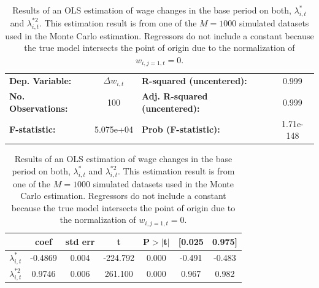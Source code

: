 \documentclass[../main.tex]{subfiles}
\begin{document}
\begin{table}[!htbp]
\begin{center}
\begin{tabular}{lclc}
\toprule
\textbf{Dep. Variable:}    & $\Delta w_{i,t}$ & \textbf{  R-squared (uncentered):}      &      0.999   \\
\textbf{No. Observations:} &       100        & \textbf{  Adj. R-squared (uncentered):} &      0.999   \\
\textbf{F-statistic:}      &  5.075e+04       & \textbf{  Prob (F-statistic):}          & 1.71e-148   \\
\bottomrule
\end{tabular}
\begin{tabular}{lcccccc}
                  & \textbf{coef} & \textbf{std err} & \textbf{t} & \textbf{P$> |$t$|$} & \textbf{[0.025} & \textbf{0.975]}  \\
\midrule
\textbf{$\lambda_{i, t}^{*}$}   &       -0.4869  &        0.004     &   -224.792 &         0.000        &        -0.491   &        -0.483    \\
\textbf{$\lambda_{i, t}^{*2}$} &        	0.9746  &        0.006     &    261.100  &         0.000        &         0.967    &         0.982    \\
\bottomrule
\end{tabular}

\end{center}
\caption{Results of an OLS estimation of wage changes in the base period on both, $\lambda_{i, t}^{*}$ and $\lambda_{i, t}^{*2}$. This estimation result is from one of the $M = 1000$ simulated datasets used in the Monte Carlo estimation. Regressors do not include a constant because the true model intersects the point of origin due to the normalization of $w_{i,j=1,t} = 0$.}
\label{tab:base_period_regression_rlst_t}
\end{table}
\FloatBarrier
\end{document}
